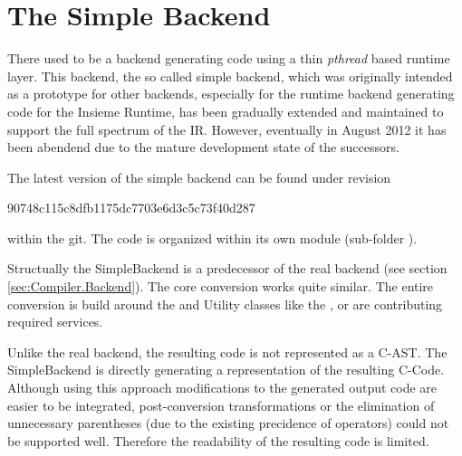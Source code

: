 \section{The Simple Backend}
There used to be a backend generating code using a thin \textit{pthread} based
runtime layer. This backend, the so called simple backend, which was originally
intended as a prototype for other backends, especially for the runtime backend
generating code for the Insieme Runtime, has been gradually extended and
maintained to support the full spectrum of the IR. However, eventually in August
2012 it has been abendend due to the mature development state of the successors.

The latest version of the simple backend can be found under revision 
\begin{center}
90748c115c8dfb1175dc7703e6d3c5c73f40d287
\end{center}
within the git. The code is organized within its own module (sub-folder
).

Structually the SimpleBackend is a predecessor of the real backend (see section
\ref{sec:Compiler.Backend}). The core conversion works quite similar. The entire
conversion is build around the  and Utility classes
like the ,  or  are
contributing required services. 

Unlike the real backend, the resulting code is not represented as a C-AST. The
SimpleBackend is directly generating a  representation of the
resulting C-Code. Although using this approach modifications to the generated
output code are easier to be integrated, post-conversion transformations or the
elimination of unnecessary parentheses (due to the existing precidence of
operators) could not be supported well. Therefore the readability of the
resulting code is limited.


